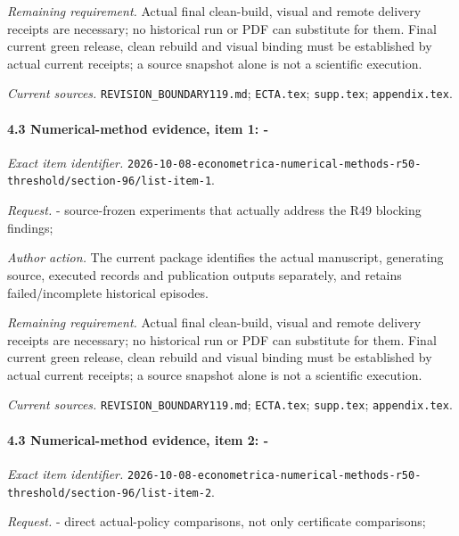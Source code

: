 \par\emph{Remaining requirement.} Actual final clean-build, visual and remote delivery receipts are necessary; no historical run or PDF can substitute for them. Final current green release, clean rebuild and visual binding must be established by actual current receipts; a source snapshot alone is not a scientific execution.

\par\emph{Current sources.} \nolinkurl{REVISION_BOUNDARY119.md}; \nolinkurl{ECTA.tex}; \nolinkurl{supp.tex}; \nolinkurl{appendix.tex}.

\paragraph{4.3 Numerical-method evidence, item 1: -}

\emph{Exact item identifier.} \nolinkurl{2026-10-08-econometrica-numerical-methods-r50-threshold/section-96/list-item-1}.

\par\emph{Request.} - source-frozen experiments that actually address the R49 blocking findings;

\par\emph{Author action.} The current package identifies the actual manuscript, generating source, executed records and publication outputs separately, and retains failed/\allowbreak{}incomplete historical episodes.

\par\emph{Remaining requirement.} Actual final clean-build, visual and remote delivery receipts are necessary; no historical run or PDF can substitute for them. Final current green release, clean rebuild and visual binding must be established by actual current receipts; a source snapshot alone is not a scientific execution.

\par\emph{Current sources.} \nolinkurl{REVISION_BOUNDARY119.md}; \nolinkurl{ECTA.tex}; \nolinkurl{supp.tex}; \nolinkurl{appendix.tex}.

\paragraph{4.3 Numerical-method evidence, item 2: -}

\emph{Exact item identifier.} \nolinkurl{2026-10-08-econometrica-numerical-methods-r50-threshold/section-96/list-item-2}.

\par\emph{Request.} - direct actual-policy comparisons, not only certificate comparisons;

